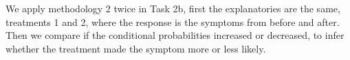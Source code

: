 

We apply methodology 2 twice in Task 2b, first the explanatories are the same, treatments 1 and 2, where the response is the symptoms from before and after. Then we compare if the conditional probabilities increased or decreased, to infer whether the treatment made the symptom more or less likely.

\label{sec:Experimenting}
